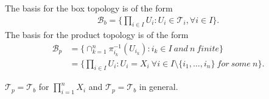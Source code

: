 \documentclass[a4paper,english,12pt]{article}   	%
\begin{document}
\begin{thm}
The basis for the  box topology is of the form 
\begin{align*}
\mathcal{B}_{b} = \{\prod_{i \in I} U_{i} \colon U_{i} \in \mathcal{T}_{i} , \forall i \in I \}.
\end{align*}
The basis for the  product topology is of the form 
\begin{align*}
\mathcal{B}_{p} &= \{ \cap_{k=1}^{n} \pi_{i_{k}}^{-1}(U_{i_{k}}) \colon i_{k} \in I ~and ~n ~finite  \} \\ &= \{ \prod_{i \in I} U_{i} \colon U_{i} = X_{i}  ~\forall i \in I \setminus \{i_{1},\ldots,i_{n}\} ~for ~some ~n\}.
\end{align*}
\end{thm}
\begin{lem}
$\mathcal{T}_{p} = \mathcal{T}_{b}$ for $\prod_{i =1}^{n} X_{i}$ and $\mathcal{T}_{p} = \mathcal{T}_{b}$ in general.
\end{lem}
\end{document}
